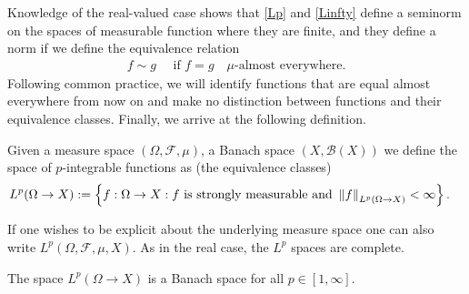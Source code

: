\documentclass[
    a4paper,
    DIV=14,
    abstract=true,
    numbers=noenddot
]{scrartcl}
\begin{document}
Knowledge of the real-valued case shows that \eqref{Lp} and \eqref{Linfty} define a seminorm on the spaces of measurable function where they are finite, and they define a norm if we define the equivalence relation
\begin{align*}
	f \sim g\quad \text{ if } f=g\quad \mu\text{-almost everywhere}.
\end{align*}
Following common practice, we will identify functions that are equal almost everywhere from now on and make no distinction between functions and their equivalence classes. Finally, we arrive at the following definition.

\begin{definition}\label{def:Lp}
	Given a measure space $(\Omega,\mathcal{F},\mu)$, a Banach space $(X,\mathcal{B}(X))$ we define the space of $p$-integrable functions as (the equivalence classes)
	\begin{align*}
		L^p(\Omega \to X) & :=\left\{f:\Omega\to X: f \text{ is strongly measurable and } \left\lVert f \right\rVert_{L^p(\Omega \to X)}<\infty\right\}.
	\end{align*}
\end{definition}
If one wishes to be explicit about the underlying measure space one can also write $L^p(\Omega,\mathcal{F},\mu, X)$. As in the real case, the $L^p$ spaces are complete.
\begin{theorem}\label{thm:completeness}
	The space $L^p(\Omega\to X)$ is a Banach space for all $p\in [1,\infty].$
\end{theorem}
\end{document}
